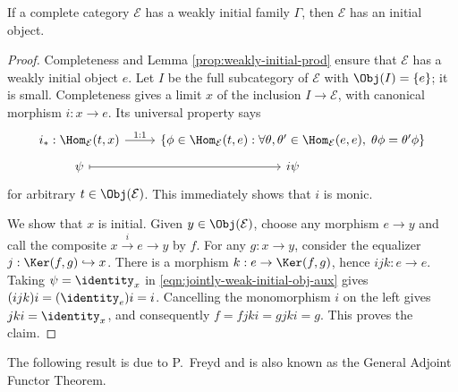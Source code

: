 \begin{lemma}\label{prop:jointly-weak-initial-obj}
	If a complete category $\mathcal{E}$ has a weakly initial family $\Gamma$,
	then $\mathcal{E}$ has an initial object.
\end{lemma}
\begin{proof}
	Completeness and Lemma \ref{prop:weakly-initial-prod} ensure that
	$\mathcal{E}$ has a weakly initial object $e$. Let $I$ be the full
	subcategory of $\mathcal{E}$ with $\Obj(I)=\{e\}$; it is small.
	Completeness gives a limit $x$ of the inclusion $I\to\mathcal{E}$, with
	canonical morphism $i:x\to e$. Its universal property says
	\begin{equation}\label{eqn:jointly-weak-initial-obj-aux}
	\begin{tikzcd}[row sep=tiny]
		i_*: \Hom_{\mathcal{E}}(t, x) \arrow[r, "1:1"] & \left\{ \phi \in \Hom_{\mathcal{E}}(t, e) : \forall \theta, \theta' \in \Hom_{\mathcal{E}}(e, e), \; \theta \phi = \theta' \phi \right\} \\
		\psi \arrow[r, mapsto] & i\psi
	\end{tikzcd}\end{equation}
	for arbitrary $t\in\Obj(\mathcal{E})$. This immediately shows that $i$ is
	monic.

	We show that $x$ is initial. Given $y\in\Obj(\mathcal{E})$, choose any
	morphism $e\to y$ and call the composite $x\xrightarrow{i}e\to y$ by
	$f$. For any $g:x\to y$, consider the equalizer
	$j:\Ker(f,g)\hookrightarrow x$. There is a morphism
	$k:e\to\Ker(f,g)$, hence $ijk:e\to e$. Taking $\psi=\identity_x$ in
	\eqref{eqn:jointly-weak-initial-obj-aux} gives
	$(ijk)i=(\identity_e)i=i$. Cancelling the monomorphism $i$ on the left
	gives $jki=\identity_x$, and consequently $f=fjki=gjki=g$. This proves the
	claim.
\end{proof}

The following result is due to P.\ Freyd and is also known as the General
Adjoint Functor Theorem.

